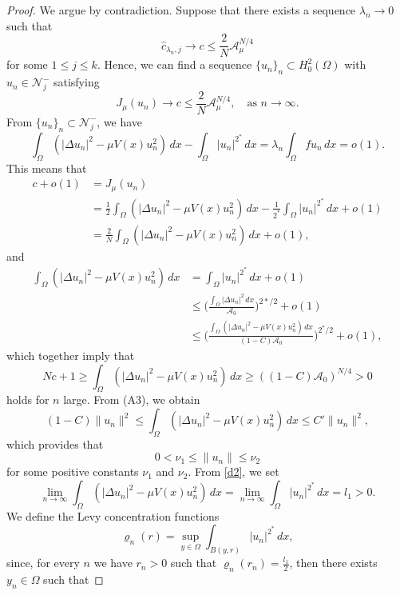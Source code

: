 \documentclass[10pt,a4paper]{amsart}
\numberwithin{equation}{section}
\begin{document}
\begin{proof}
We argue by contradiction. Suppose that there exists a sequence \(\lambda_n\to 0\) 
such that
 \[
 \hat{c}_{\lambda_n,j}\to c\leq \frac{2}{N}\mathcal{A}_{\mu}^{N/4}
 \]
for some \(1\leq j\leq k\). Hence, we can find a sequence 
\(\{u_n\}_n\subset H^2_0(\Omega)\) with \(u_n\in \mathcal{N}^-_j\) satisfying
\begin{equation}\label{d1}
 J_\mu(u_n)\to c\leq \frac{2}{N}\mathcal{A}_{\mu}^{N/4}, \quad\text{as }
  n\to \infty.
\end{equation}
From $\{u_n\}_n\subset \mathcal{N}^-_j$, we have
\begin{equation}\label{d2}
 \int_{\Omega}(|\Delta u_n|^2-\mu V(x)u_n^2)\,dx
 - \int_{\Omega} |u_n|^{2^*}\,dx=\lambda_n \int_{\Omega} fu_n \,dx=o(1).
 \end{equation}
This means that
\begin{align*}
 c+o(1)&=J_\mu(u_n)\\
 &=\frac{1}{2}\int_{\Omega}(|\Delta u_n|^2-\mu V(x)u_n^2)\,dx-\frac{1}{2^*} \int_{\Omega} |u_n|^{2^*}\,dx+o(1)\\
 &=\frac{2}{N}\int_{\Omega}(|\Delta u_n|^2-\mu V(x)u_n^2)\,dx+o(1),
\end{align*}
and
 \begin{align*}
 \int_{\Omega}(|\Delta u_n|^2-\mu V(x)u_n^2)\,dx&=\int_{\Omega} |u_n|^{2^*}\,dx+o(1)\\
 &\leq \Big( \frac{\int_{\Omega}|\Delta u_n|^2\,dx}{\mathcal{A}_0}\Big) ^{2*/2}+o(1)\\
 &\leq \Big( \frac{\int_{\Omega}(|\Delta u_n|^2-\mu V(x)u_n^2)\,dx}{(1-C)\mathcal{A}_0}
 \Big) ^{2^*/2}+o(1),
 \end{align*}
 which together imply that
 \[
 Nc+1\geq \int_{\Omega}(|\Delta u_n|^2-\mu V(x)u_n^2)\,dx\geq \left( (1-C)\mathcal{A}_0\right) ^{N/4}>0
 \]
holds for \(n\) large. From (A3), we obtain
\[
 (1-C)\|u_n\|^2\leq \int_{\Omega}(|\Delta u_n|^2-\mu V(x)u_n^2)\,dx \leq C'\|u_n\|^2,
\]
which provides that
\begin{equation}\label{d3}
 0<\nu_1\leq \|u_n\|\leq \nu_2
\end{equation}
for some positive constants $\nu_1$ and $\nu_2$. From \eqref{d2}, we set
\[
 \lim_{n\to \infty}\int_{\Omega}(|\Delta u_n|^2-\mu V(x)u_n^2)\,dx
 =\lim_{n\to \infty} \int_{\Omega} |u_n|^{2^*}\,dx=l_1>0.
\]
We define the Levy concentration functions
\[
 \varrho_n(r)=\sup_{y\in \Omega}\int _{B(y, r)}|u_n|^{2^*}\,dx,
\]
since, for every $n$ we have $r_n>0$ such that \(\varrho_n(r_n)=\frac{l_1}{2}\), then there exists \(y_n\in \Omega\) such that

\end{proof}
\end{document}
